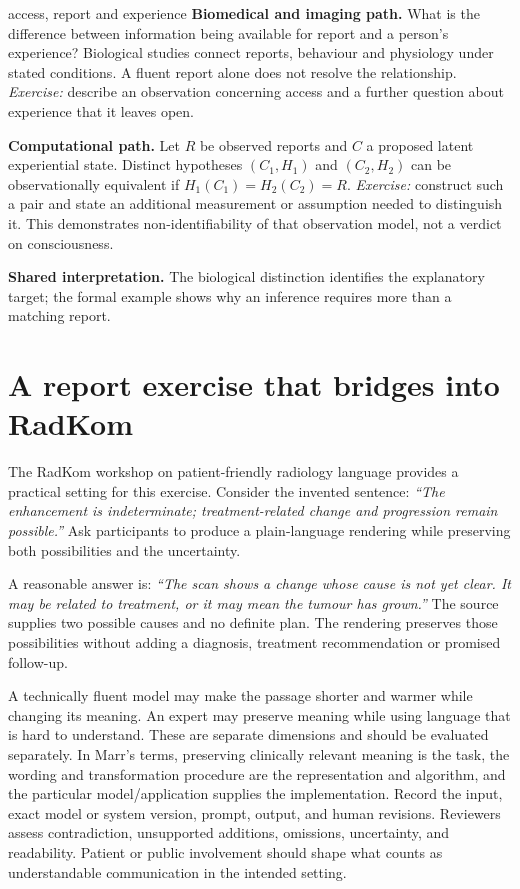 \documentclass[11pt,a4paper]{article}
\begin{document}
\begin{perspectives}{access, report and experience}
\textbf{Biomedical and imaging path.} What is the difference between information being available for report and a person's experience? Biological studies connect reports, behaviour and physiology under stated conditions. A fluent report alone does not resolve the relationship. \emph{Exercise:} describe an observation concerning access and a further question about experience that it leaves open.

\textbf{Computational path.} Let $R$ be observed reports and $C$ a proposed latent experiential state. Distinct hypotheses $(C_1,H_1)$ and $(C_2,H_2)$ can be observationally equivalent if $H_1(C_1)=H_2(C_2)=R$. \emph{Exercise:} construct such a pair and state an additional measurement or assumption needed to distinguish it. This demonstrates non-identifiability of that observation model, not a verdict on consciousness.

\textbf{Shared interpretation.} The biological distinction identifies the explanatory target; the formal example shows why an inference requires more than a matching report.
\end{perspectives}


\section{A report exercise that bridges into RadKom}\label{sec:report}
The RadKom workshop on patient-friendly radiology language provides a practical setting for this exercise. Consider the invented sentence: \emph{``The enhancement is indeterminate; treatment-related change and progression remain possible.''} Ask participants to produce a plain-language rendering while preserving both possibilities and the uncertainty.

A reasonable answer is: \emph{``The scan shows a change whose cause is not yet clear. It may be related to treatment, or it may mean the tumour has grown.''} The source supplies two possible causes and no definite plan. The rendering preserves those possibilities without adding a diagnosis, treatment recommendation or promised follow-up.

A technically fluent model may make the passage shorter and warmer while changing its meaning. An expert may preserve meaning while using language that is hard to understand. These are separate dimensions and should be evaluated separately. In Marr's terms, preserving clinically relevant meaning is the task, the wording and transformation procedure are the representation and algorithm, and the particular model/application supplies the implementation. Record the input, exact model or system version, prompt, output, and human revisions. Reviewers assess contradiction, unsupported additions, omissions, uncertainty, and readability. Patient or public involvement should shape what counts as understandable communication in the intended setting.
\end{document}
